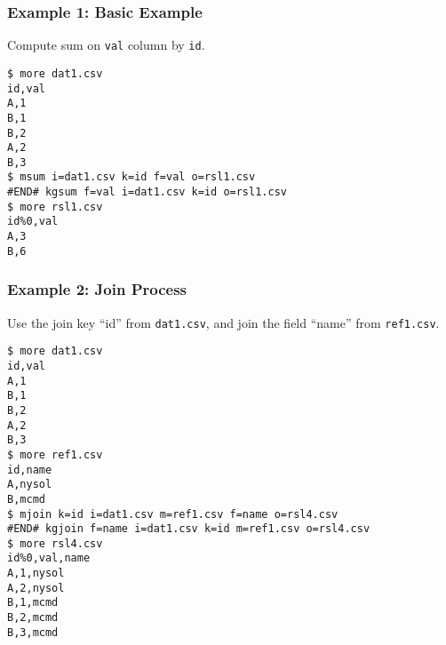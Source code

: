\subsubsection*{Example 1: Basic Example}

Compute sum on \verb|val| column by \verb|id|.


\begin{Verbatim}[baselinestretch=0.7,frame=single]
$ more dat1.csv
id,val
A,1
B,1
B,2
A,2
B,3
$ msum i=dat1.csv k=id f=val o=rsl1.csv
#END# kgsum f=val i=dat1.csv k=id o=rsl1.csv
$ more rsl1.csv
id%0,val
A,3
B,6
\end{Verbatim}
\subsubsection*{Example 2: Join Process}

Use the join key “id” from \verb|dat1.csv|, and join the field “name” from \verb|ref1.csv|.


\begin{Verbatim}[baselinestretch=0.7,frame=single]
$ more dat1.csv
id,val
A,1
B,1
B,2
A,2
B,3
$ more ref1.csv
id,name
A,nysol
B,mcmd
$ mjoin k=id i=dat1.csv m=ref1.csv f=name o=rsl4.csv
#END# kgjoin f=name i=dat1.csv k=id m=ref1.csv o=rsl4.csv
$ more rsl4.csv
id%0,val,name
A,1,nysol
A,2,nysol
B,1,mcmd
B,2,mcmd
B,3,mcmd
\end{Verbatim}
